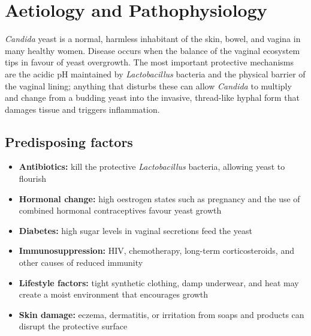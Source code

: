 \section*{Aetiology and Pathophysiology}
\textit{Candida} yeast is a normal, harmless inhabitant of the skin, bowel, and vagina in many healthy women. Disease occurs when the balance of the vaginal ecosystem tips in favour of yeast overgrowth. The most important protective mechanisms are the acidic pH maintained by \textit{Lactobacillus} bacteria and the physical barrier of the vaginal lining; anything that disturbs these can allow \textit{Candida} to multiply and change from a budding yeast into the invasive, thread-like hyphal form that damages tissue and triggers inflammation.

\subsection*{Predisposing factors}
\begin{itemize}
    \item \textbf{Antibiotics:} kill the protective \textit{Lactobacillus} bacteria, allowing yeast to flourish
    \item \textbf{Hormonal change:} high oestrogen states such as pregnancy and the use of combined hormonal contraceptives favour yeast growth
    \item \textbf{Diabetes:} high sugar levels in vaginal secretions feed the yeast
    \item \textbf{Immunosuppression:} HIV, chemotherapy, long-term corticosteroids, and other causes of reduced immunity
    \item \textbf{Lifestyle factors:} tight synthetic clothing, damp underwear, and heat may create a moist environment that encourages growth
    \item \textbf{Skin damage:} eczema, dermatitis, or irritation from soaps and products can disrupt the protective surface
\end{itemize}


